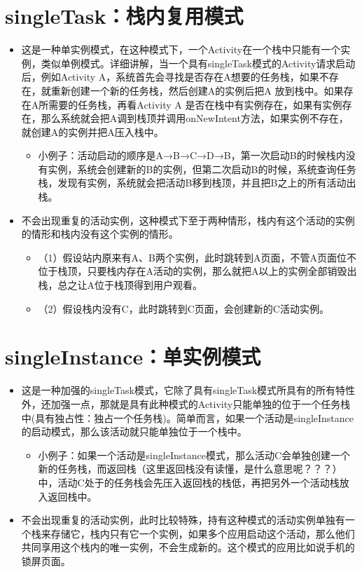 \documentclass[9pt, b5paaper]{book}
\begin{document}
\section{singleTask：栈内复用模式}
\label{sec-4-3}
\begin{itemize}
\item 这是一种单实例模式，在这种模式下，一个Activity在一个栈中只能有一个实例，类似单例模式。详细讲解，当一个具有singleTask模式的Activity请求启动后，例如Activity A，系统首先会寻找是否存在A想要的任务栈，如果不存在，就重新创建一个新的任务栈，然后创建A的实例后把A 放到栈中。如果存在A所需要的任务栈，再看Activity A 是否在栈中有实例存在，如果有实例存在，那么系统就会把A调到栈顶并调用onNewIntent方法，如果实例不存在，就创建A的实例并把A压入栈中。 
\begin{itemize}
\item 小例子：活动启动的顺序是A→B→C→D→B，第一次启动B的时候栈内没有实例，系统会创建新的B的实例，但第二次启动B的时候，系统查询任务栈，发现有实例，系统就会把活动B移到栈顶，并且把B之上的所有活动出栈。
\end{itemize}
\item 不会出现重复的活动实例，这种模式下至于两种情形，栈内有这个活动的实例的情形和栈内没有这个实例的情形。
\begin{itemize}
\item （1）假设站内原来有A、B两个实例，此时跳转到A页面，不管A页面位不位于栈顶，只要栈内存在A活动的实例，那么就把A以上的实例全部销毁出栈，总之让A位于栈顶得到用户观看。
\item （2）假设栈内没有C，此时跳转到C页面，会创建新的C活动实例。
\end{itemize}
\end{itemize}

\section{singleInstance：单实例模式}
\label{sec-4-4}
\begin{itemize}
\item 这是一种加强的singleTask模式，它除了具有singleTask模式所具有的所有特性外，还加强一点，那就是具有此种模式的Activity只能单独的位于一个任务栈中(具有独占性：独占一个任务栈)。简单而言，如果一个活动是singleInstance的启动模式，那么该活动就只能单独位于一个栈中。
\begin{itemize}
\item 小例子：如果一个活动是singleInstance模式，那么活动C会单独创建一个新的任务栈，而返回栈（这里返回栈没有读懂，是什么意思呢？？？）中，活动C处于的任务栈会先压入返回栈的栈低，再把另外一个活动栈放入返回栈中。
\end{itemize}
\item 不会出现重复的活动实例，此时比较特殊，持有这种模式的活动实例单独有一个栈来存储它，栈内只有它一个实例，如果多个应用启动这个活动，那么他们共同享用这个栈内的唯一实例，不会生成新的。这个模式的应用比如说手机的锁屏页面。
\end{itemize}
\end{document}
